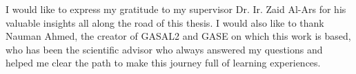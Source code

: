 

\vskip 1cm

I would like to express my gratitude to my supervisor Dr. Ir. Zaid Al-Ars for his valuable insights all along the road of this thesis. I would also like to thank Nauman Ahmed, the creator of GASAL2 and GASE on which this work is based, who has been the scientific advisor who always answered my questions and helped me clear the path to make this journey full of learning experiences.



\vskip 2cm
\noindent \AUTHOR \\
\PLACE \\
\DATE

